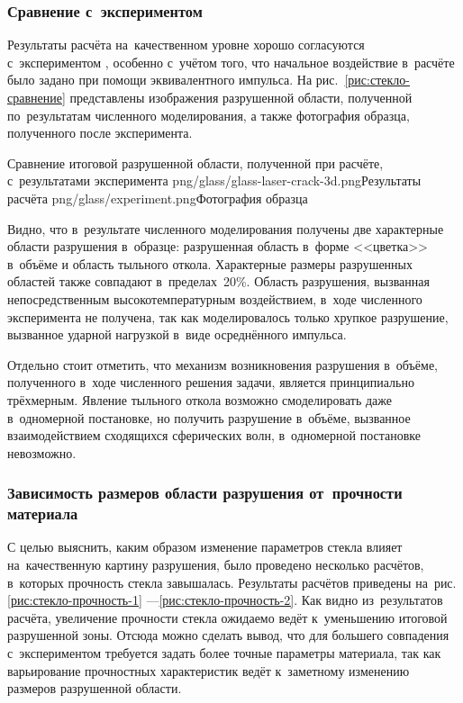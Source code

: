 \documentclass[thesis.tex]{subfiles}
\begin{document}
\FloatBarrier

\subsubsection{Сравнение с~экспериментом}

Результаты расчёта на~качественном уровне хорошо согласуются с~экспериментом \cite{demidov2015new}, особенно с~учётом
того, что начальное воздействие в~расчёте было задано при помощи эквивалентного импульса. На
рис.~\ref{рис:стекло-сравнение} представлены изображения разрушенной области, полученной по~результатам численного
моделирования, а также фотография образца, полученного после эксперимента.

        {Сравнение итоговой разрушенной области, полученной при расчёте, с~результатами эксперимента}
        {png/glass/glass-laser-crack-3d.png}{Результаты расчёта}
        {png/glass/experiment.png}{Фотография образца}

Видно, что в~результате численного моделирования получены две характерные области разрушения в~образце: разрушенная
область в~форме <<цветка>> в~объёме и область тыльного откола. Характерные размеры разрушенных областей также совпадают в~пределах~20\%.
Область разрушения, вызванная непосредственным высокотемпературным воздействием, в~ходе численного
эксперимента не получена, так как моделировалось только хрупкое разрушение, вызванное ударной нагрузкой в~виде
осреднённого импульса.

Отдельно стоит отметить, что механизм возникновения разрушения в~объёме, полученного в~ходе численного решения задачи,
является принципиально трёхмерным. Явление тыльного откола возможно смоделировать даже в~одномерной постановке, но
получить разрушение в~объёме, вызванное взаимодействием сходящихся сферических волн, в~одномерной постановке невозможно.

\subsubsection[Зависимость размеров области разрушения\\от~прочности материала]{Зависимость размеров области разрушения от~прочности материала}

С целью выяснить, каким образом изменение параметров стекла влияет на~качественную картину разрушения, было проведено
несколько расчётов, в~которых прочность стекла завышалась. Результаты расчётов приведены на~рис. \ref{рис:стекло-прочность-1}
---\ref{рис:стекло-прочность-2}. Как видно из~результатов расчёта, увеличение прочности стекла ожидаемо
ведёт к~уменьшению итоговой разрушенной зоны. Отсюда можно сделать вывод, что для большего совпадения с~экспериментом
требуется задать более точные параметры материала, так как варьирование прочностных характеристик ведёт к~заметному
изменению размеров разрушенной области.
\end{document}
